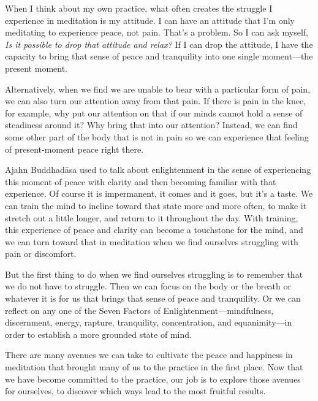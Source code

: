 When I think about my own practice, what often creates the struggle I 
experience in meditation is my attitude. I can have an attitude that 
I'm only meditating to experience peace, not pain. That's a problem. So 
I can ask myself, \emph{Is it possible to drop that attitude and 
relax?} If I can drop the attitude, I have the capacity to bring that 
sense of peace and tranquility into one single moment---the present 
moment.

Alternatively, when we find we are unable to bear with a particular 
form of pain, we can also turn our attention away from that pain. If 
there is pain in the knee, for example, why put our attention on that 
if our minds cannot hold a sense of steadiness around it? Why bring 
that into our attention? Instead, we can find some other part of the 
body that is not in pain so we can experience that feeling of 
present-moment peace right there.

Ajahn Buddhadāsa used to talk about enlightenment in the sense of 
experiencing this moment of peace with clarity and then becoming 
familiar with that experience. Of course it is impermanent, it comes 
and it goes, but it's a taste. We can train the mind to incline toward 
that state more and more often, to make it stretch out a little longer, 
and return to it throughout the day. With training, this experience of 
peace and clarity can become a touchstone for the mind, and we can turn 
toward that in meditation when we find ourselves struggling with pain 
or discomfort.

But the first thing to do when we find ourselves struggling is to 
remember that we do not have to struggle. Then we can focus on the body 
or the breath or whatever it is for us that brings that sense of peace 
and tranquility. Or we can reflect on any one of the Seven Factors of 
Enlightenment---mindfulness, discernment, energy, rapture, tranquility, 
concentration, and equanimity---in order to establish a more grounded 
state of mind.

There are many avenues we can take to cultivate the peace and happiness 
in meditation that brought many of us to the practice in the first 
place. Now that we have become committed to the practice, our job is to 
explore those avenues for ourselves, to discover which ways lead to the 
most fruitful results.


